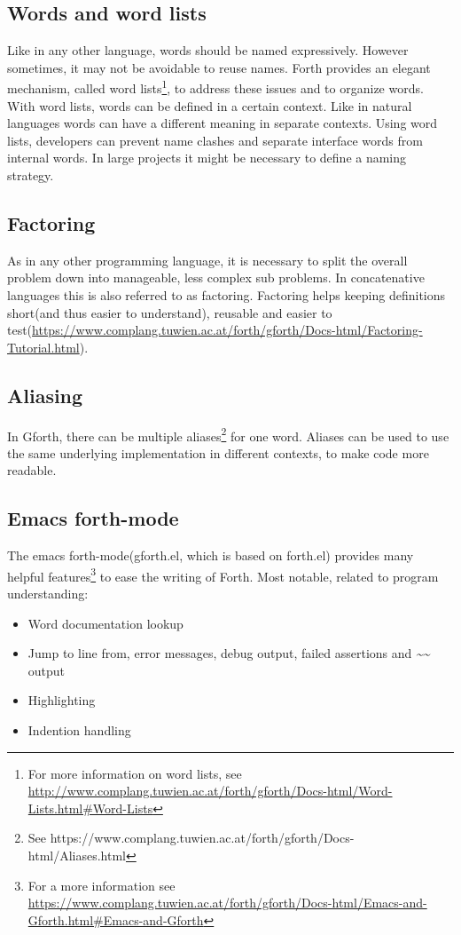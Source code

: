 \subsection*{Words and word lists}
Like in any other language, words should be named expressively. However sometimes, it may not be avoidable to reuse names. Forth provides an elegant mechanism, called word lists\footnote{For more information on word lists, see \url{http://www.complang.tuwien.ac.at/forth/gforth/Docs-html/Word-Lists.html\#Word-Lists}}, to address these issues and to organize words. With word lists, words can be defined in a certain context. Like in natural languages words can have a different meaning in separate contexts. Using word lists, developers can prevent name clashes and separate interface words from internal words. In large projects it might be necessary to define a naming strategy.

\subsection*{Factoring}
As in any other programming language, it is necessary to split the overall problem down into manageable, less complex sub problems. In concatenative languages this is also referred to as factoring. Factoring helps keeping definitions short(and thus easier to understand), reusable and easier to test(\url{https://www.complang.tuwien.ac.at/forth/gforth/Docs-html/Factoring-Tutorial.html}).

\subsection*{Aliasing}
In Gforth, there can be multiple aliases\footnote{See https://www.complang.tuwien.ac.at/forth/gforth/Docs-html/Aliases.html} for one word. Aliases can be used to use the same underlying implementation in different contexts, to make code more readable.

\subsection*{Emacs forth-mode}

The emacs forth-mode(gforth.el, which is based on forth.el) provides many helpful features\footnote{For a more information see \url{https://www.complang.tuwien.ac.at/forth/gforth/Docs-html/Emacs-and-Gforth.html\#Emacs-and-Gforth}} to ease the writing of Forth. Most notable, related to program understanding:
\begin{itemize}
\item Word documentation lookup
\item Jump to line from, error messages, debug output, failed assertions and \emph{\textasciitilde\textasciitilde} output
\item Highlighting
\item Indention handling
\end{itemize}

